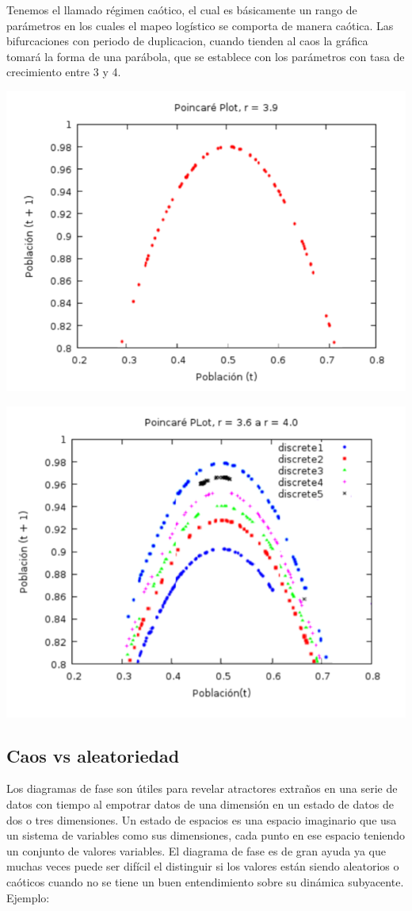 \documentclass{article}
\begin{document}
Tenemos el llamado régimen caótico, el cual es básicamente un rango de parámetros en los cuales el mapeo logístico se comporta de manera caótica. Las bifurcaciones con periodo de duplicacion, cuando tienden al caos la gráfica tomará la forma de una parábola, que se establece con los parámetros con tasa de crecimiento entre 3 y 4.
\begin{center}
\includegraphics[scale=0.6]{Act108.PNG}
\end{center}
\begin{center}
\includegraphics[scale=0.6]{Act109.PNG}
\end{center}

\subsection{Caos vs aleatoriedad}
Los diagramas de fase son útiles para revelar atractores extraños en una serie de datos con tiempo al empotrar datos de una dimensión en un estado de datos de dos o tres dimensiones. Un estado de espacios es una espacio imaginario que usa un sistema de variables como sus dimensiones, cada punto en ese espacio teniendo un conjunto de valores variables. El diagrama de fase es de gran ayuda ya que muchas veces puede ser difícil el distinguir si los valores están siendo aleatorios o caóticos cuando no se tiene un buen entendimiento sobre su dinámica subyacente. Ejemplo:
\end{document}
